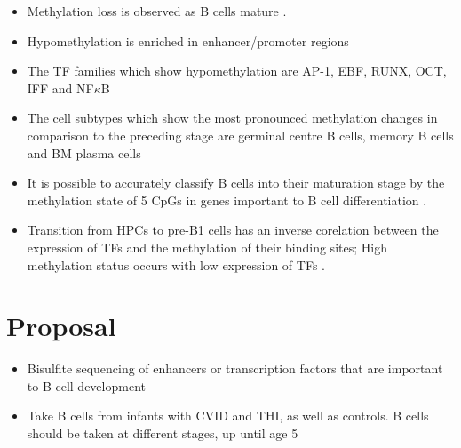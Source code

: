 \documentclass[12pt]{article}
\begin{document}
			\begin{itemize}
				\item Methylation loss is observed as B cells mature \citep{Oakes16}.
				\item Hypomethylation is enriched in enhancer/promoter regions
				\item The TF families which show hypomethylation are AP-1, EBF, RUNX, OCT, IFF and NF$\kappa$B
				\item The cell subtypes which show the most pronounced methylation changes in comparison to the preceding stage are germinal centre B cells, memory B cells and BM plasma cells \citep{Kulis15}
				\item It is possible to accurately classify B cells into their maturation stage by the methylation state of 5 CpGs in genes important to B cell differentiation \citep{Kulis15}.
				\item Transition from HPCs to pre-B1 cells has an inverse corelation between the expression of TFs and the methylation of their binding sites; High methylation status occurs with low expression of TFs \citep{Kulis15}. 
			\end{itemize}

			
	\section{Proposal}
		
		

		\begin{itemize}
			\item Bisulfite sequencing of enhancers or transcription factors that are important to B cell development
			\item Take B cells from infants with CVID and THI, as well as controls. B cells should be taken at different stages, up until age 5
		\end{itemize}

\newpage
%	
	
	
	
\end{document}
